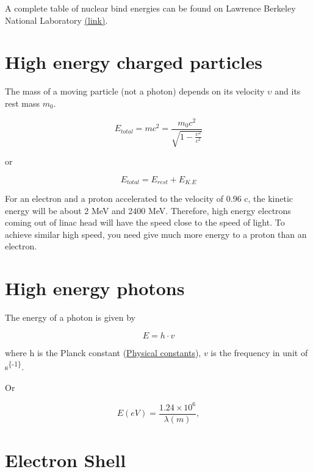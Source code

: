 \documentclass[]{book}
\theoremstyle{definition}
\theoremstyle{definition}
\theoremstyle{definition}
\theoremstyle{remark}
\begin{document}
A complete table of nuclear bind energies can be found on Lawrence
Berkeley National Laboratory
\href{http://xdb.lbl.gov/Section1/Table_1-1.pdf}{(link)}.

\section{High energy charged particles}\label{einstein}

The mass of a moving particle (not a photon) depends on its velocity
\(\upsilon\) and its rest mass \(m_0\).

\begin{equation}
    E_{total} = mc^2 = \frac{m_0c^2}{\sqrt{1-\frac{\upsilon^2}{c^2}}} 
    \label{eq:emc2}
\end{equation}

or

\begin{equation}
    E_{total} = E_{rest}+E_{K.E} 
\end{equation}

For an electron and a proton accelerated to the velocity of 0.96 c, the
kinetic energy will be about 2 MeV and 2400 MeV. Therefore, high energy
electrons coming out of linac head will have the speed close to the
speed of light. To achieve similar high speed, you need give much more
energy to a proton than an electron.

\section{High energy photons}\label{high-energy-photons}

The energy of a photon is given by

\begin{equation}
    E = h\cdot v
    \label{eq:frequency}
\end{equation}

where h is the Planck constant (\protect\hyperlink{constant}{Physical
constants}), \(v\) is the frequency in unit of
s\textsuperscript{\{-1\}}.

Or

\begin{equation}
    E (eV) = \frac{1.24\times 10^{6}}{\lambda (m)}, 
    \label{eq:wavelength}
\end{equation}

\section{Electron Shell}\label{electron-shell}
\end{document}
